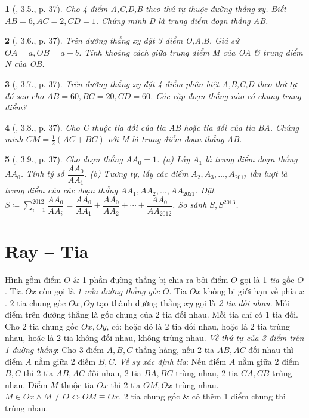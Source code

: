 \documentclass{article}
\newtheorem{baitoan}{}
\begin{document}
\begin{baitoan}[\cite{TLCT_THCS_Toan_6_hinh_hoc}, 3.5., p. 37]
	Cho 4 điểm A,C,D,B theo thứ tự thuộc đường thẳng xy. Biết $AB = 6,AC = 2,CD = 1$. Chứng minh D là trung điểm đoạn thẳng AB.
\end{baitoan}

\begin{baitoan}[\cite{TLCT_THCS_Toan_6_hinh_hoc}, 3.6., p. 37]
	Trên đường thẳng xy đặt 3 điểm O,A,B. Giả sử $OA = a,OB = a + b$. Tính khoảng cách giữa trung điểm M của OA \& trung điểm N của OB.
\end{baitoan}

\begin{baitoan}[\cite{TLCT_THCS_Toan_6_hinh_hoc}, 3.7., p. 37]
	Trên đường thẳng xy đặt 4 điểm phân biệt A,B,C,D theo thứ tự đó sao cho $AB = 60,BC = 20,CD = 60$. Các cặp đoạn thẳng nào có chung trung điểm?
\end{baitoan}

\begin{baitoan}[\cite{TLCT_THCS_Toan_6_hinh_hoc}, 3.8., p. 37]
	Cho C thuộc tia đối của tia AB hoặc tia đối của tia BA. Chứng minh $CM = \frac{1}{2}(AC + BC)$ với M là trung điểm đoạn thẳng AB.
\end{baitoan}

\begin{baitoan}[\cite{TLCT_THCS_Toan_6_hinh_hoc}, 3.9., p. 37]
	Cho đoạn thẳng $AA_0 = 1$. (a) Lấy $A_1$ là trung điểm đoạn thẳng $AA_0$. Tính tỷ số $\dfrac{AA_0}{AA_1}$. (b) Tương tự, lấy các điểm $A_2,A_3,\ldots,A_{2012}$ lần lượt là trung điểm của các đoạn thẳng $AA_1,AA_2,\ldots,AA_{2021}$. Đặt $S\coloneqq\sum_{i=1}^{2012} \dfrac{AA_0}{AA_i} = \dfrac{AA_0}{AA_1} + \dfrac{AA_0}{AA_2} + \cdots + \dfrac{AA_0}{AA_{2012}}$. So sánh $S,S^{2013}$.
\end{baitoan}


\section{Ray -- Tia}
 Hình gồm điểm $O$ \& 1 phần đường thẳng bị chia ra bởi điểm $O$ gọi là 1 \textit{tia} gốc $O$. Tia $Ox$ còn gọi là \textit{1 nửa đường thẳng gốc $O$}. Tia $Ox$ không bị giới hạn về phía $x$.  2 tia chung gốc $Ox,Oy$ tạo thành đường thẳng $xy$ gọi là \textit{2 tia đối nhau}. Mỗi điểm trên đường thẳng là gốc chung của 2 tia đối nhau. Mỗi tia chỉ có 1 tia đối.  Cho 2 tia chung gốc $Ox,Oy$, có: hoặc đó là 2 tia đối nhau, hoặc là 2 tia trùng nhau, hoặc là 2 tia không đối nhau, không trùng nhau.  \textit{Về thứ tự của 3 điểm trên 1 đường thẳng}: Cho 3 điểm $A,B,C$ thẳng hàng, nếu 2 tia $AB,AC$ đối nhau thì điểm $A$ nằm giữa 2 điểm $B,C$.  \textit{Về sự xác định tia}: Nếu điểm $A$ nằm giữa 2 điểm $B,C$ thì 2 tia $AB,AC$ đối nhau, 2 tia $BA,BC$ trùng nhau, 2 tia $CA,CB$ trùng nhau.  Điểm $M$ thuộc tia $Ox$ thì 2 tia $OM,Ox$ trùng nhau. $M\in Ox\land M\ne O\Leftrightarrow OM\equiv Ox$.  2 tia chung gốc \& có thêm 1 điểm chung thì trùng nhau.
\end{document}
